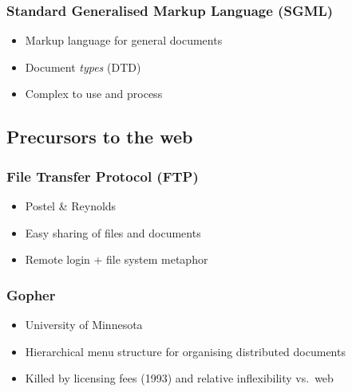 \frame
{
	\frametitle{Standard Generalised Markup Language (SGML)}

	\begin{itemize}
	
		\item Markup language for general documents
		
		\item Document \emph{types} (DTD)
		
		
		\item Complex to use and process
	
	\end{itemize}
	
}




\subsection*{Precursors to the web}




{
	\frametitle{File Transfer Protocol (FTP)}

	\begin{itemize}
	
		\item Postel \& Reynolds
	
		\item Easy sharing of files and documents
		
		\item Remote login + file system metaphor
	
	\end{itemize}
	
}





\frame
{
	\frametitle{Gopher}
	
	\begin{itemize}
	
		\item University of Minnesota
		
		\item Hierarchical menu structure for organising distributed
		documents
		
		\item Killed by licensing fees (1993) and relative inflexibility
		vs.\ web
	
	\end{itemize}

}

